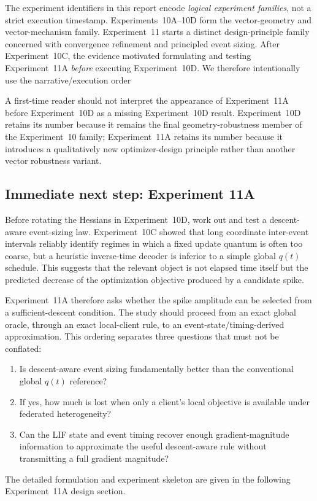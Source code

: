 The experiment identifiers in this report encode \emph{logical experiment families}, not a strict execution timestamp. Experiments~10A--10D form the vector-geometry and vector-mechanism family. Experiment~11 starts a distinct design-principle family concerned with convergence refinement and principled event sizing. After Experiment~10C, the evidence motivated formulating and testing Experiment~11A \emph{before} executing Experiment~10D. We therefore intentionally use the narrative/execution order
\begin{center}
\end{center}
A first-time reader should not interpret the appearance of Experiment~11A before Experiment~10D as a missing Experiment~10D result. Experiment~10D retains its number because it remains the final geometry-robustness member of the Experiment~10 family; Experiment~11A retains its number because it introduces a qualitatively new optimizer-design principle rather than another vector robustness variant.

\subsection{Immediate next step: Experiment 11A}

Before rotating the Hessians in Experiment~10D, work out and test a descent-aware event-sizing law. Experiment~10C showed that long coordinate inter-event intervals reliably identify regimes in which a fixed update quantum is often too coarse, but a heuristic inverse-time decoder is inferior to a simple global $q(t)$ schedule. This suggests that the relevant object is not elapsed time itself but the predicted decrease of the optimization objective produced by a candidate spike.

Experiment~11A therefore asks whether the spike amplitude can be selected from a sufficient-descent condition. The study should proceed from an exact global oracle, through an exact local-client rule, to an event-state/timing-derived approximation. This ordering separates three questions that must not be conflated:
\begin{enumerate}
  \item Is descent-aware event sizing fundamentally better than the conventional global $q(t)$ reference?
  \item If yes, how much is lost when only a client's local objective is available under federated heterogeneity?
  \item Can the LIF state and event timing recover enough gradient-magnitude information to approximate the useful descent-aware rule without transmitting a full gradient magnitude?
\end{enumerate}
The detailed formulation and experiment skeleton are given in the following Experiment~11A design section.

